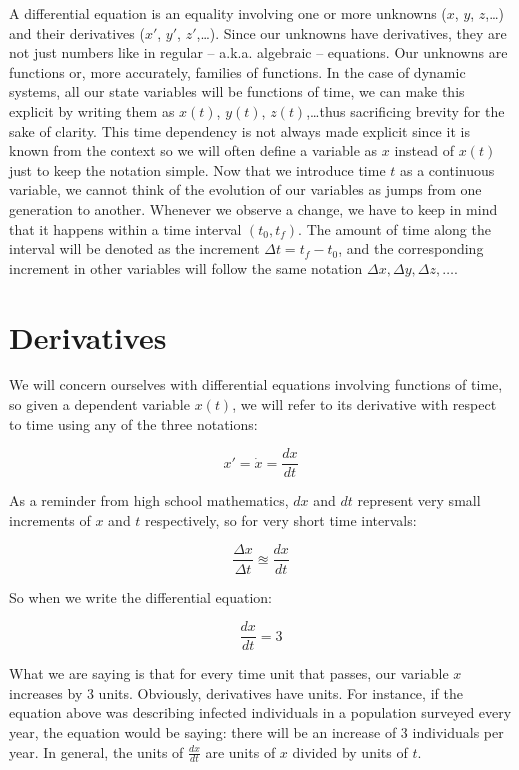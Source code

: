 \documentclass{tufte-book} %
\begin{document}
A differential equation is an equality involving one or more unknowns ($x$, $y$, $z$,\dots) and their derivatives ($x'$, $y'$, $z'$,\dots). Since our unknowns have derivatives, they are not just numbers like in regular -- a.k.a. algebraic -- equations. Our unknowns are functions or, more accurately, families of functions. In the case of dynamic systems, all our state variables will be functions of time, we can make this explicit by writing them as $x(t)$, $y(t)$, $z(t)$,\dots thus sacrificing brevity for the sake of clarity. This time dependency is not always made explicit since it is known from the context so we will often define a variable as $x$ instead of $x(t)$ just to keep the notation simple.
Now that we introduce time $t$ as a continuous variable, we cannot think of the evolution of our variables as jumps from one generation to another. Whenever we observe a change, we have to keep in mind that it happens within a time interval $(t_0, t_f)$. The amount of time along the interval will be denoted as the increment $\Delta t = t_f - t_0$, and the corresponding increment in other variables will follow the same notation $\Delta x, \Delta y, \Delta z, \dots$.

\section{Derivatives}

We will concern ourselves with differential equations involving functions of time, so given a dependent variable $x(t)$, we will refer to its derivative with respect to time using any of the three notations: 

\begin{equation*}
	x' = \dot{x} = \frac{dx}{dt}  
\end{equation*}

As a reminder from high school mathematics, $dx$ and $dt$ represent very small increments of $x$ and $t$ respectively, so for very short time intervals:

\begin{equation*}
\frac{\Delta x}{\Delta t}   \approxeq \frac{dx}{dt}  
\end{equation*}

So when we write the differential equation:

\begin{equation}
	\frac{dx}{dt}  = 3
\label{simplestode}
\end{equation}

What we are saying is that for every time unit that passes, our variable $x$ increases by 3 units. Obviously, derivatives have units. For instance, if the equation above was describing infected individuals in a population surveyed every year, the equation would be saying: there will be an increase of 3 individuals per year. In general, the units of $\frac{dx}{dt}$ are units of $x$ divided by units of $t$.
\end{document}
